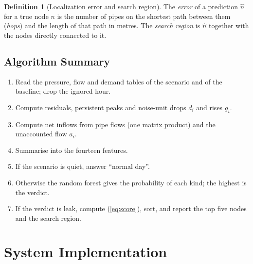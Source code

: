 \documentclass[11pt,letterpaper]{report}
\theoremstyle{definition}
\newtheorem{definition}[theorem]{Definition}
\theoremstyle{plain}
\theoremstyle{remark}
\begin{document}
\begin{definition}[Localization error and search region]
The \emph{error} of a prediction $\hat n$ for a true node $n$ is the number of pipes on the shortest path between them (\emph{hops}) and the length of that path in metres. The \emph{search region} is $\hat n$ together with the nodes directly connected to it.
\end{definition}

\section{Algorithm Summary}
\begin{enumerate}[label=\textbf{Step \arabic*.},leftmargin=*]
\item Read the pressure, flow and demand tables of the scenario and of the baseline; drop the ignored hour.
\item Compute residuals, persistent peaks and noise-unit drops $d_i$ and rises $g_i$.
\item Compute net inflows from pipe flows (one matrix product) and the unaccounted flow $a_i$.
\item Summarise into the fourteen features.
\item If the scenario is quiet, answer ``normal day''.
\item Otherwise the random forest gives the probability of each kind; the highest is the verdict.
\item If the verdict is leak, compute (\ref{eq:score}), sort, and report the top five nodes and the search region.
\end{enumerate}

\chapter{System Implementation}
\end{document}
